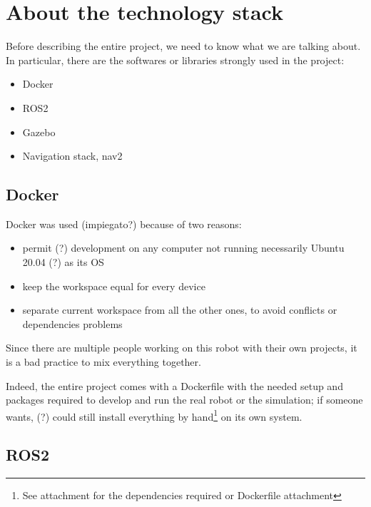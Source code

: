 \chapter{About the technology stack}
\label{cha:techstack}

Before describing the entire project, we need to know what we are talking about. In particular, there are the softwares or libraries strongly used in the project:  
\begin{itemize}
    \item Docker
    \item ROS2
    \item Gazebo
    \item Navigation stack, nav2
    \end{itemize}

    \section{Docker}

Docker was used (impiegato?) because of two reasons:
\begin{itemize}
    \item permit (?) development on any computer not running necessarily Ubuntu 20.04 (?) as its OS
    \item keep the workspace equal for every device
    \item separate current workspace from all the other ones, to avoid conflicts or dependencies problems
\end{itemize}  

Since there are multiple people working on this robot with their own projects, it is a bad practice to mix everything together. %

Indeed, the entire project comes with a Dockerfile with the needed setup and packages required to develop and run the real robot or the simulation; if someone wants, (?) could still install everything by hand\footnote{See attachment for the dependencies required or Dockerfile attachment} on its own system.


\section{ROS2}


